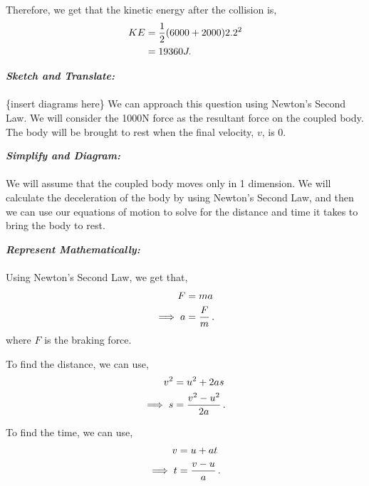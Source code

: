 \begin{subquestions}
\begin{subsubquestions}
Therefore, we get that the kinetic energy after the collision is,
\begin{align}
	KE & = \frac{1}{2}(6000+2000)2.2^2 \nonumber \\
	   & = 19360J.
\end{align} 


\subsubquestion

\textbf{\textit{Sketch and Translate:}} \\ \\
\{insert diagrams here\}
We can approach this question using Newton's Second Law. We will consider the 1000N force as the resultant force on the coupled body. The body will be brought to rest when the final velocity, $v$, is 0.




\textbf{\textit{Simplify and Diagram:}} \\ \\
We will assume that the coupled body moves only in 1 dimension. We will calculate the deceleration of the body by using Newton's Second Law, and then we can use our equations of motion to solve for the distance and time it takes to bring the body to rest.




\textbf{\textit{Represent Mathematically:}} \\ \\ 
Using Newton's Second Law, we get that,
\begin{align}
	F & = ma \nonumber \\
	\implies a & = \frac{F}{m} \label{2008J:q5:AEqn1} \,.
\end{align}
where $F$ is the braking force.

To find the distance, we can use,
\begin{align}
	v^2 & = u^2 + 2as \nonumber \\
	\implies s & = \frac{v^2-u^2}{2a} \label{2008J:q5:SEqn1} \,.
\end{align}

To find the time, we can use,
\begin{align}
	v & = u+at \nonumber \\
	\implies t & = \frac{v-u}{a} \label{2008J:q5:TEqn1} \,.
\end{align}





\end{subsubquestions}
\end{subquestions}
